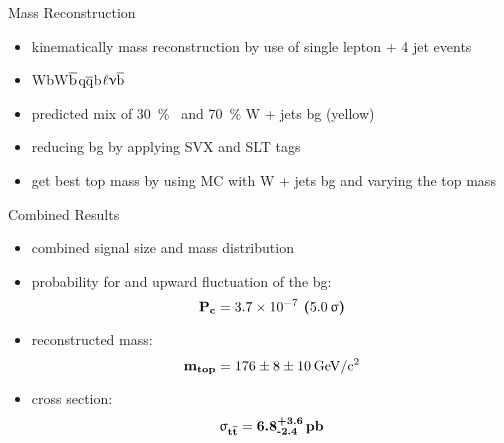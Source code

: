 \begin{frame}{Mass Reconstruction}
	
	\begin{itemize}\itemfill
		\item kinematically mass reconstruction by use of single lepton + 4 jet events
		\item \ttb\ch{->}WbW$\overline{\z{b}}$\ch{->}$\z{q}\overline{\z{q}}$b$\ell\upnu\overline{\z{b}}$
		\item predicted mix of \SI{30}{\%} \ttb\ and \SI{70}{\%} W + jets bg (yellow)
		\item reducing bg by applying SVX and SLT tags
		\item get best top mass by using MC with W + jets bg and varying the top mass
	\end{itemize}
	
	\begin{figure}\vspace*{-5pt}
		\centering
	\end{figure}\vspace*{-20pt}
	
\end{frame}
\begin{frame}{Combined Results}
	
	\begin{itemize}\itemfill
		\item combined signal size and mass distribution
		\item probability for and upward fluctuation of the bg: 
		{\begin{equation*} \z{\textbf{P}}_{\z{\textbf{c}}} = \textbf{\SI{3.7e-7}{} (\SI{5.0}{\upsigma})} \end{equation*}}
		\item reconstructed mass:
		{\begin{equation*} \z{\textbf{m}}_{\z{\textbf{top}}} = \textbf{\SI[parse-numbers=false]{176\pm8\pm10}{\giga\electronvolt\per c^2}} \end{equation*}}
		\item cross section:
		{\begin{equation*} \mathbf{\upsigma}_{\z{\textbf{t}}\overline{\z{\textbf{t}}}} = \textbf{6.8}^{\textbf{+3.6}}_{\textbf{-2.4}}\, \z{\textbf{pb}} \end{equation*}}
	\end{itemize}
	
\end{frame}
